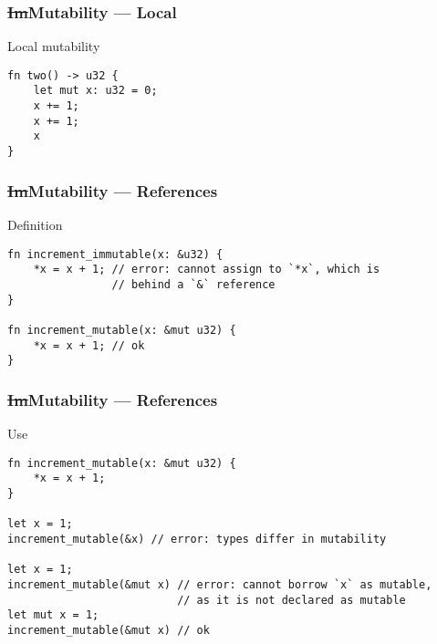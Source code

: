 \documentclass[t]{beamer}
\begin{document}
\begin{frame}[c,fragile]
\frametitle{\st{Im}Mutability --- Local}
\begin{comment}
Most benign form of mutability because it is compositional. When I call a
function, that function's use of local mutability is not a concern to me.
\end{comment}

\begin{block}{Local mutability}
\begin{verbatim}
fn two() -> u32 {
    let mut x: u32 = 0;
    x += 1;
    x += 1;
    x
}
\end{verbatim}
\end{block}

\end{frame}


\begin{frame}[c,fragile]
\frametitle{\st{Im}Mutability --- References}
\begin{comment}
Because the mutability is in the type signature, I'm consciously opting in to
(potential) mutation when I call such functions.
\end{comment}

\begin{block}{Definition}
\small
\begin{verbatim}
fn increment_immutable(x: &u32) {
    *x = x + 1; // error: cannot assign to `*x`, which is
                // behind a `&` reference
}

fn increment_mutable(x: &mut u32) {
    *x = x + 1; // ok
}
\end{verbatim}
\end{block}

\end{frame}


\begin{frame}[c,fragile]
\frametitle{\st{Im}Mutability --- References}
\begin{comment}
Because the mutability is in the type signature, I'm consciously opting in to
(potential) mutation when I call such functions.
\end{comment}

\begin{block}{Use}
\small
\begin{verbatim}
fn increment_mutable(x: &mut u32) {
    *x = x + 1;
}

let x = 1;
increment_mutable(&x) // error: types differ in mutability

let x = 1;
increment_mutable(&mut x) // error: cannot borrow `x` as mutable,
                          // as it is not declared as mutable
let mut x = 1;
increment_mutable(&mut x) // ok
\end{verbatim}
\end{block}

\end{frame}
\end{document}
